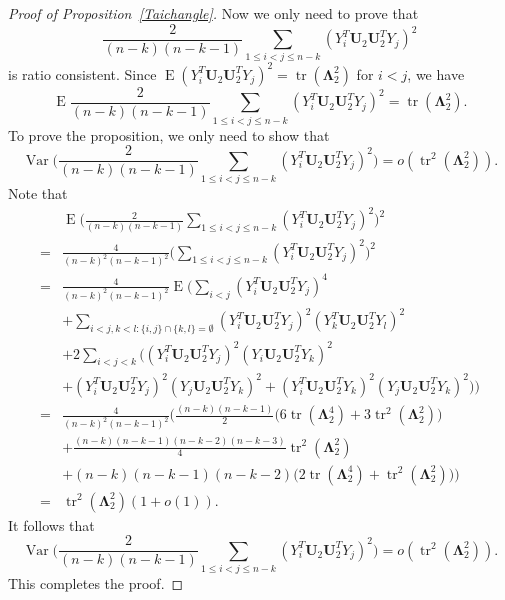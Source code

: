 \documentclass[12pt]{article} %
\DeclareMathOperator{\mytr}{tr}
\DeclareMathOperator{\myE}{E}
\DeclareMathOperator{\myVar}{Var}
\newcommand{\bU}{\mathbf{U}}
\newcommand{\bfsym}[1]{\ensuremath{\boldsymbol{#1}}}
\def\bLambda {\bfsym {\Lambda}}
\theoremstyle{definition}
\begin{document}
\begin{appendices}
\begin{proof}[Proof of Proposition~\ref{Taichangle}]
        Now we only need to prove that
        $$
    \frac{2}{(n-k)(n-k-1)}\sum_{1\leq i<j\leq n-k}(Y_i^T \bU_2 \bU_2^T Y_j)^2 
        $$
        is ratio consistent.
        Since $\myE (Y_i^T \bU_2 \bU_2^T Y_j)^2=\mytr(\bLambda_2^2)$ for $i< j$, we have
    $$
        \myE
    \frac{2}{(n-k)(n-k-1)}\sum_{1\leq i<j\leq n-k}(Y_i^T \bU_2 \bU_2^T Y_j)^2 
        =\mytr(\bLambda_2^2).
        $$
        To prove the proposition, we only need to show that 
        $$
        \myVar
    \Big(
    \frac{2}{(n-k)(n-k-1)}\sum_{1\leq i<j\leq n-k}(Y_i^T \bU_2 \bU_2^T Y_j)^2 
    \Big)
        =o(\mytr^2(\bLambda_2^2)).
        $$
         Note that
         $$
        \begin{aligned}
            &\myE\Big(
    \frac{2}{(n-k)(n-k-1)}\sum_{1\leq i<j\leq n-k}(Y_i^T \bU_2 \bU_2^T Y_j)^2 
            \Big)^2\\
            =&
            \frac{4}{(n-k)^2(n-k-1)^2}\Big(\sum_{1\leq i < j\leq n-k}(Y_i^T \bU_2 \bU_2^T Y_j)^2\Big)^2\\
            =&
            \frac{4}{(n-k)^2(n-k-1)^2}\myE\Big( \sum_{i<j}(Y_i^T\bU_2 \bU_2^T Y_j)^4\\
            &+
            \sum_{i<j,k<l:\{i,j\}\cap\{k,l\}=\emptyset}(Y_i^T\bU_2 \bU_2^T Y_j)^2 (Y_k^T\bU_2 \bU_2^T Y_l)^2\\
            &+2\sum_{i<j<k}\big((Y_i^T\bU_2 \bU_2^T Y_j)^2(Y_i\bU_2 \bU_2^T Y_k)^2\\
            &+(Y_i^T\bU_2 \bU_2^T Y_j)^2(Y_j\bU_2 \bU_2^T Y_k)^2+(Y_i^T\bU_2 \bU_2^T Y_k)^2(Y_j\bU_2 \bU_2^T Y_k)^2\big) \Big)\\
            =&
    \frac{4}{(n-k)^2(n-k-1)^2}\Big(
            \frac{(n-k)(n-k-1)}{2}\big(6\mytr(\bLambda_2^4)+3\mytr^2(\bLambda_2^2)\big)\\
            &+\frac{(n-k)(n-k-1)(n-k-2)(n-k-3)}{4}\mytr^2(\bLambda_2^2)\\
            &+(n-k)(n-k-1)(n-k-2)\big(2\mytr(\bLambda_2^4)
            +\mytr^2(\bLambda_2^2)\big)
            \Big)\\
            =&
            \mytr^2(\bLambda_2^2)(1+o(1)).
        \end{aligned}
         $$
        It follows that
        $$
        \myVar
    \Big(\frac{2}{(n-k)(n-k-1)}\sum_{1\leq i<j\leq n-k}(Y_i^T \bU_2 \bU_2^T Y_j)^2 
    \Big)
            =
            o(\mytr^2(\bLambda_2^2)).
        $$
        This completes the proof.
\end{proof}
\end{appendices}
%
\vskip 14pt
\end{document}
